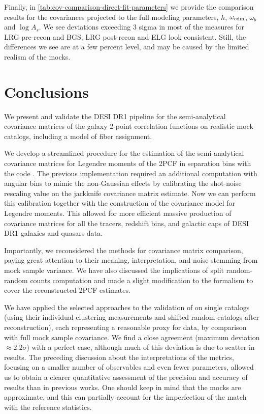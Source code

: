 Finally, in \cref{tab:cov-comparison-direct-fit-parameters} we provide the comparison results for the covariances projected to the full modeling parameters, $h$, $\omega_{\rm cdm}$, $\omega_b$ and $\log A_s$.
We see deviations exceeding 3 sigma in most of the measures for LRG pre-recon and BGS; LRG post-recon and ELG look consistent.
Still, the differences we see are at a few percent level, and may be caused by the limited realism of the mocks.

\section{Conclusions}
\label{sec:conclusion-rascalc}

We present and validate the DESI DR1 pipeline for the semi-analytical covariance matrices of the galaxy 2-point correlation functions on realistic mock catalogs, including a model of fiber assignment.

We develop a streamlined procedure for the estimation of the semi-analytical covariance matrices for Legendre moments of the 2PCF in separation bins with the \rascalc{} code \citep{rascalC}.
The previous implementation \citep{rascalC-legendre-3} required an additional computation with angular bins to mimic the non-Gaussian effects by calibrating the shot-noise rescaling value on the jackknife covariance matrix estimate.
Now we can perform this calibration together with the construction of the covariance model for Legendre moments.
This allowed for more efficient massive production of covariance matrices for all the tracers, redshift bins, and galactic caps of DESI DR1 galaxies and quasars data.

Importantly, we reconsidered the methods for covariance matrix comparison, paying great attention to their meaning, interpretation, and noise stemming from mock sample variance.
We have also discussed the implications of split random-random counts computation and made a slight modification to the formalism to cover the reconstructed 2PCF estimates.

We have applied the selected approaches to the validation of \rascalc{} on single \themock{} catalogs (using their individual clustering measurements and shifted random catalogs after reconstruction), each representing a reasonable proxy for \desimtwo{} data, by comparison with full mock sample covariance.
We find a close agreement (maximum deviation $\approx 2.2\sigma$) with a perfect case, although much of this deviation is due to scatter in \rascalc{} results.
The preceding discussion about the interpretations of the metrics, focusing on a smaller number of observables and even fewer parameters, allowed us to obtain a clearer quantitative assessment of the precision and accuracy of \rascalc{} results than in previous works.
One should keep in mind that the mocks are approximate, and this can partially account for the imperfection of the match with the reference statistics.

